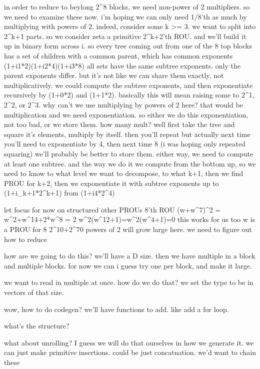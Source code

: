 in order to reduce to beylong 2^8 blocks, we need non-power of 2 multipliers.
so we need to examine these now.
i'm hoping we can only need 1/8'th as much by multiplying with powers of 2.
indeed, consider some k >= 3. 
we want to split into 2^{k+1} parts.
so we consider zeta a primitive 2^{k+2}'th ROU.
and we'll build it up in binary form across i.
so every tree coming out from one of the 8 top blocks has a set of children with a common parent, which has common exponents (1+i1*2)(1+i2*4)(1+i3*8)
all sets have the same subtree exponents. only the parent exponents differ.
but it's not like we can share them exactly, not multiplicatively. we could compute the subtree exponents, and then exponentiate recursively by (1+0*2) and (1+1*2). basically this will mean raising some to 2^1, 2^2, or 2^3.
why can't we use multiplying by powers of 2 here? that would be multiplication and we need exponentiation.
so either we do this exponentiation, not too bad, or we store them. how many mult? well first take the tree and square it's elements, multiply by itself. then you'll repeat but actually next time you'll need to exponentiate by 4, then next time 8 (i was hoping only repeated squaring)
we'll probably be better to store them.
either way, we need to compute at least one subtree. and the way we do it we compute from the bottom up, so we need to know to what level we want to decompose, to what k+1, then we find PROU for k+2, then we exponentiate it with subtree exponents up to (1+i_{k+1}*2^{k+1}) from (1+i4*2^4)


let focus for now on structured other PROUs
8'th ROU
(w+w^7)^2 = w^2+w^14+2*w^8 = 2
w^2(w^12+1)=w^2(w^4+1)=0
this works for us too
w is a PROU for 8
2^10+2^70
powers of 2 will grow large here. we need to figure out how to reduce


how are we going to do this?
we'll have a D size. then we have multiple in a block and multiple blocks.
for now we can i guess try one per block, and make it large. 

we want to read in multiple at once. how do we do that? we set the type to be in vectors of that size.




wow, how to do codegen?
we'll have functions to add.
like add a for loop.

what's the structure?

what about unrolling? I guess we will do that ourselves in how we generate it.
we can just make primitive insertions. could be just concatnation. 
we'd want to chain these

